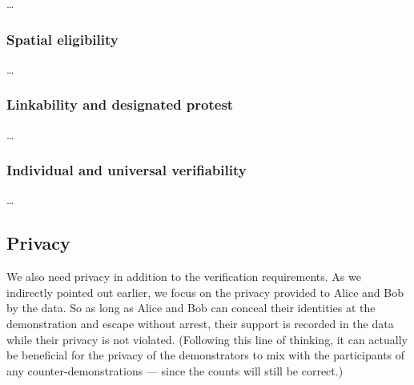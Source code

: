 \begin{frame}
\begin{definition}
  \dots
\end{definition}
\end{frame}

\subsubsection{Spatial eligibility}

\begin{frame}
\begin{definition}
  \dots
\end{definition}
\end{frame}

\subsubsection{Linkability and designated protest}

\dots

\subsubsection{Individual and universal verifiability}

\dots

\subsection{Privacy}%
\label{Privacy}

We also need privacy in addition to the verification requirements.
As we indirectly pointed out earlier, we focus on the privacy provided to Alice 
and Bob by the data.
So as long as Alice and Bob can conceal their identities at the demonstration 
and escape without arrest, their support is recorded in the data while their 
privacy is not violated.
(Following this line of thinking, it can actually be beneficial for the privacy 
of the demonstrators to mix with the participants of any counter-demonstrations 
--- since the counts will still be correct.)

